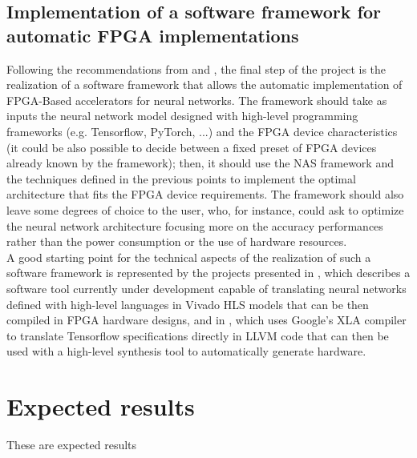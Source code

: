 \documentclass[11pt,a4paper]{article}
\begin{document}
\subsection{Implementation of a software framework for automatic FPGA implementations}
Following the recommendations from \cite{wang_survey_2018} and \cite{shawahna_review_2019}, the final step of the project is the realization of a software framework that allows the automatic implementation of FPGA-Based accelerators for neural networks. The framework should take as inputs the neural network model designed with high-level programming frameworks (e.g. Tensorflow, PyTorch, ...) and the FPGA device characteristics (it could be also possible to decide between a fixed preset of FPGA devices already known by the framework); then, it should use the NAS framework and the techniques defined in the previous points to implement the optimal architecture that fits the FPGA device requirements. The framework should also leave some degrees of choice to the user, who, for instance, could ask to optimize the neural network architecture focusing more on the accuracy performances rather than the power consumption or the use of hardware resources.
\\A good starting point for the technical aspects of the realization of such a software framework is represented by the projects presented in \cite{duarte_hls4ml_2018}, which describes a software tool currently under development capable of translating neural networks defined with high-level languages in Vivado HLS models that can be then compiled in FPGA hardware designs, and in \cite{noronha_leflow_2018}, which uses Google’s XLA compiler to translate Tensorflow specifications directly in LLVM code that can then be used with a high-level synthesis tool to automatically generate hardware.

\section{Expected results}
These are expected results



\end{document}
